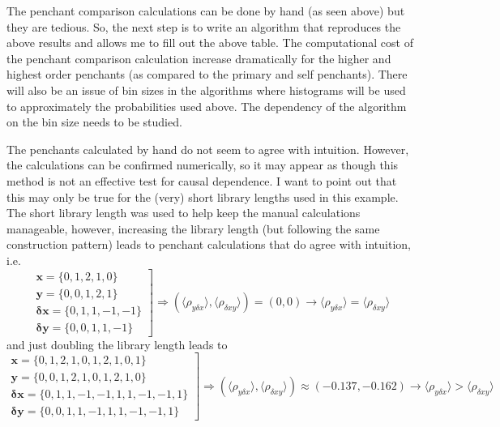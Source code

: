 \documentclass[a4paper,11pt]{article}
\begin{document}
The penchant comparison calculations can be done by hand (as seen above) but they are tedious.  So, the next step is to write an algorithm that reproduces the above results and allows me to fill out the above table.  The computational cost of the penchant comparison calculation increase dramatically for the higher and highest order penchants (as compared to the primary and self penchants).  There will also be an issue of bin sizes in the algorithms where histograms will be used to approximately the probabilities used above.  The dependency of the algorithm on the bin size needs to be studied.  

The penchants calculated by hand do not seem to agree with intuition.  However, the calculations can be confirmed numerically, so it may appear as though this method is not an effective test for causal dependence.  I want to point out that this may only be true for the (very) short library lengths used in this example.  The short library length was used to help keep the manual calculations manageable, however, increasing the library length (but following the same construction pattern) leads to penchant calculations that do agree with intuition, i.e.\
\begin{equation}
\left.
\begin{array}{c}
\mathbf{x} = \{0,1,2,1,0\}\\
\mathbf{y} = \{0,0,1,2,1\}\\
\mathbf{\delta x} = \{0,1,1,-1,-1\}\\
\mathbf{\delta y} = \{0,0,1,1,-1\}
\end{array}
\right] \Rightarrow \left(\langle \rho_{y\delta x}\rangle, \langle \rho_{\delta xy}\rangle\right) = \left(0,0\right) \rightarrow \langle \rho_{y\delta x}\rangle = \langle \rho_{\delta xy}\rangle
\end{equation}
and just doubling the library length leads to
\begin{equation}
\left.
\begin{array}{c}
\mathbf{x} = \{0,1,2,1,0,1,2,1,0,1\}\\
\mathbf{y} = \{0,0,1,2,1,0,1,2,1,0\}\\
\mathbf{\delta x} = \{0,1,1,-1,-1,1,1,-1,-1,1\}\\
\mathbf{\delta y} = \{0,0,1,1,-1,1,1,-1,-1,1\}
\end{array}
\right] \Rightarrow \left(\langle \rho_{y\delta x}\rangle, \langle \rho_{\delta xy}\rangle\right) \approx \left(-0.137,-0.162\right) \rightarrow \langle \rho_{y\delta x}\rangle > \langle \rho_{\delta xy}\rangle
\end{equation}
\end{document}
